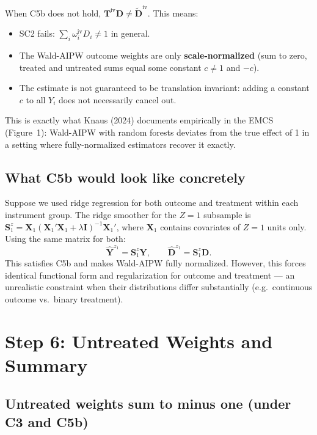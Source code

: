 \documentclass[12pt, a4paper]{article}
\theoremstyle{condstyle}
\theoremstyle{plain}
\newcommand{\bD}{\mathbf{D}}
\newcommand{\bY}{\mathbf{Y}}
\newcommand{\Yhz}[1]{\hat{\mathbf{Y}}^{z_{#1}}}   %
\newcommand{\Dhz}[1]{\hat{\mathbf{D}}^{z_{#1}}}   %
\newcommand{\Sz}[1]{\mathbf{S}^{z}_{#1}}           %
\newcommand{\Tiw}{\mathbf{T}^{\mathrm{iv}}}
\begin{document}
\begin{warnbox}
When C5b does not hold, $\Tiw\bD \neq \tilde{\mathbf{D}}^{\mathrm{iv}}$.
This means:
\begin{itemize}
  \item SC2 fails: $\sum_i\omega^{\mathrm{iv}}_iD_i \neq 1$ in general.
  \item The Wald-AIPW outcome weights are only \textbf{scale-normalized}
  (sum to zero, treated and untreated sums equal some constant $c\neq 1$ and $-c$).
  \item The estimate is not guaranteed to be translation invariant:
  adding a constant $c$ to all $Y_i$ does not necessarily cancel out.
\end{itemize}
This is exactly what Knaus (2024) documents empirically in the EMCS
(Figure~1): Wald-AIPW with random forests deviates from the true effect of 1
in a setting where fully-normalized estimators recover it exactly.
\end{warnbox}

\subsection{What C5b would look like concretely}

Suppose we used ridge regression for both outcome and treatment within
each instrument group. The ridge smoother for the $Z=1$ subsample is
$\Sz{1} = \mathbf{X}_1(\mathbf{X}_1'\mathbf{X}_1 + \lambda\mathbf{I})^{-1}\mathbf{X}_1'$,
where $\mathbf{X}_1$ contains covariates of $Z=1$ units only.
Using the same matrix for both:
\[
  \Yhz{1} = \Sz{1}\bY, \qquad \Dhz{1} = \Sz{1}\bD.
\]
This satisfies C5b and makes Wald-AIPW fully normalized.
However, this forces identical functional form and regularization for
outcome and treatment --- an unrealistic constraint when their
distributions differ substantially (e.g.\ continuous outcome vs.\ binary treatment).

\section{Step 6: Untreated Weights and Summary}
\label{sec:summary}

\subsection{Untreated weights sum to minus one (under C3 and C5b)}
\end{document}
